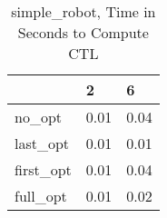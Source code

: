 \begin{table}
\caption{simple\_robot, Time in Seconds to Compute CTL}
\label{simple_robot_CTL_time}
\begin{tabular}{lll}
\toprule
 & 2 & 6 \\
\midrule
no\_opt & 0.01 & 0.04 \\
last\_opt & 0.01 & 0.01 \\
first\_opt & 0.01 & 0.04 \\
full\_opt & 0.01 & 0.02 \\
\bottomrule
\end{tabular}
\end{table}
